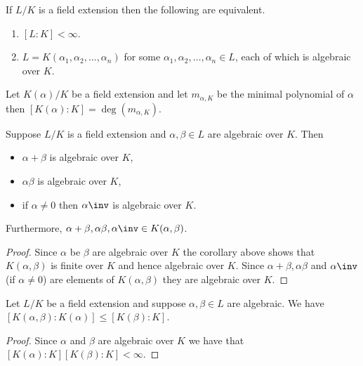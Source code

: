 \documentclass[12pt, a4paper]{article}
\begin{document}
\begin{mdcor}
    If \(L/K\) is a field extension then the following are equivalent.
    \begin{enumerate}
        \item \([L:K]<\infty\).
        \item \(L = K(\alpha_1,\alpha_2,\ldots,\alpha_n)\) for some \(\alpha_1,\alpha_2,\ldots,\alpha_n \in L\), each of which is algebraic over \(K\).
    \end{enumerate}
\end{mdcor}

\begin{mdprop}
    Let \(K(\alpha)/K\) be a field extension and let \(m_{\alpha,K}\) be the minimal polynomial of \(\alpha\) then \([K(\alpha):K]=\deg(m_{\alpha,K})\).
\end{mdprop}

\begin{lemma}
    Suppose \(L/K\) is a field extension and \(\alpha,\beta \in L\) are algebraic over \(K\). Then 
    \begin{itemize}
        \item \(\alpha+\beta\) is algebraic over \(K\),
        \item \(\alpha\beta\) is algebraic over \(K\),
        \item if \(\alpha\neq 0\) then \(\alpha\inv\) is algebraic over \(K\).
    \end{itemize}
    Furthermore, \(\alpha+\beta,\alpha\beta,\alpha\inv \in K(\alpha,\beta)\).
\end{lemma}

\begin{proof}
    Since \(\alpha\) be \(\beta\) are algebraic over \(K\) the corollary above shows that \(K(\alpha,\beta)\) is finite over \(K\) and hence algebraic over \(K\). Since \(\alpha+\beta,\alpha\beta\) and \(\alpha\inv\) (if \(\alpha\neq 0\)) are elements of \(K(\alpha,\beta)\) they are algebraic over \(K\). 
\end{proof}

\begin{lemma}
    Let \(L/K\) be a field extension and suppose \(\alpha,\beta\in L\) are algebraic. We have \([K(\alpha,\beta):K(\alpha)] \leq [K(\beta):K]\).
\end{lemma}

\begin{proof}
    Since \(\alpha\) and \(\beta\) are algebraic over \(K\) we have that \([K(\alpha):K][K(\beta):K]<\infty\).
\end{proof}
\end{document}
